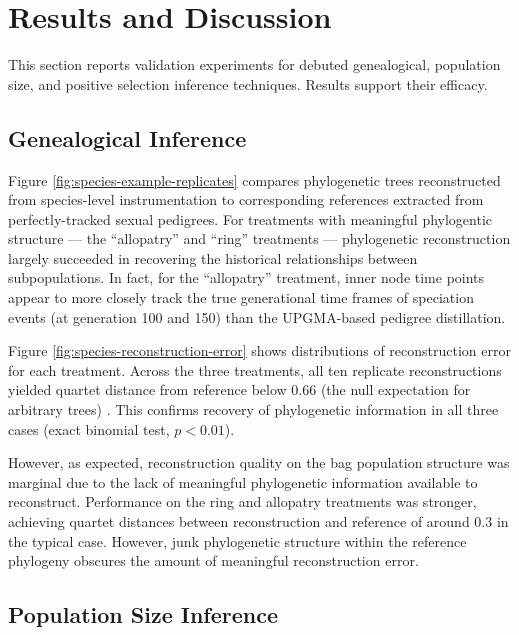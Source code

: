 \section{Results and Discussion} \label{sec:results}

This section reports validation experiments for debuted genealogical, population size, and positive selection inference techniques.
Results support their efficacy.

\subsection{Genealogical Inference}



Figure \ref{fig:species-example-replicates} compares phylogenetic trees reconstructed from species-level instrumentation to corresponding references extracted from perfectly-tracked sexual pedigrees.
For treatments with meaningful phylogentic structure --- the ``allopatry'' and ``ring'' treatments --- phylogenetic reconstruction largely succeeded in recovering the historical relationships between subpopulations.
In fact, for the ``allopatry'' treatment, inner node time points appear to more closely track the true generational time frames of speciation events (at generation 100 and 150) than the UPGMA-based pedigree distillation.

Figure \ref{fig:species-reconstruction-error} shows distributions of reconstruction error for each treatment.
Across the three treatments, all ten replicate reconstructions yielded quartet distance from reference below 0.66 (the null expectation for arbitrary trees) \citep{smith2020information}.
This confirms recovery of phylogenetic information in all three cases (exact binomial test, $p < 0.01$).

However, as expected, reconstruction quality on the bag population structure was marginal due to the lack of meaningful phylogenetic information available to reconstruct.
Performance on the ring and allopatry treatments was stronger, achieving quartet distances between reconstruction and reference of around 0.3 in the typical case.
However, junk phylogenetic structure within the reference phylogeny obscures the amount of meaningful reconstruction error.

\subsection{Population Size Inference}


